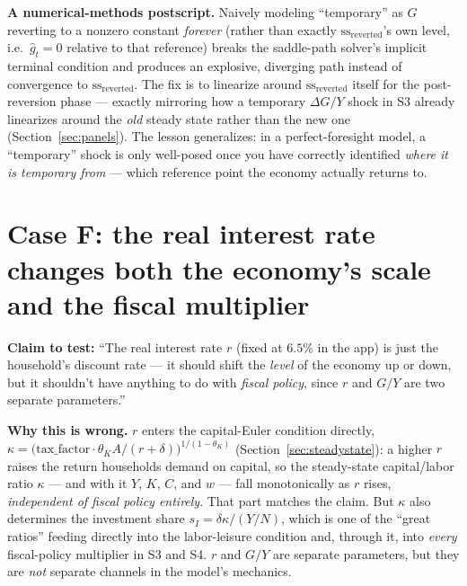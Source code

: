 \documentclass[11pt]{article}
\begin{document}
\begin{notebox}
\textbf{A numerical-methods postscript.} Naively modeling ``temporary''
as $G$ reverting to a nonzero constant \emph{forever} (rather than
exactly $\text{ss}_{\text{reverted}}$'s own level, i.e.\ $\hat g_t=0$
relative to that reference) breaks the saddle-path solver's implicit
terminal condition and produces an explosive, diverging path instead of
convergence to $\text{ss}_{\text{reverted}}$. The fix is to linearize
around $\text{ss}_{\text{reverted}}$ itself for the post-reversion phase
--- exactly mirroring how a temporary $\Delta G/Y$ shock in S3
already linearizes around the \emph{old} steady state rather than the
new one (Section~\ref{sec:panels}). The lesson generalizes: in a
perfect-foresight model, a ``temporary'' shock is only well-posed once
you have correctly identified \emph{where it is temporary from} ---
which reference point the economy actually returns to.
\end{notebox}

\section{Case F: the real interest rate changes both the economy's scale and the fiscal multiplier}
\label{sec:caseF}

\textbf{Claim to test:} ``The real interest rate $r$ (fixed at $6.5\%$ in the app) is
just the household's discount rate --- it should shift the \emph{level}
of the economy up or down, but it shouldn't have anything to do with
\emph{fiscal policy}, since $r$ and $G/Y$ are two separate
parameters.''

\textbf{Why this is wrong.} $r$ enters the capital-Euler condition
directly, $\kappa=\big(\text{tax\_factor}\cdot\theta_K A/(r+\delta)\big)^{1/(1-\theta_K)}$
(Section~\ref{sec:steadystate}): a higher $r$ raises the return households
demand on capital, so the steady-state capital/labor ratio $\kappa$ ---
and with it $Y$, $K$, $C$, and $w$ --- fall monotonically as $r$ rises,
\emph{independent of fiscal policy entirely}. That part matches the
claim. But $\kappa$ also determines the investment share
$s_I=\delta\kappa/(Y/N)$, which is one of the ``great ratios'' feeding
directly into the labor-leisure condition and, through it, into
\emph{every} fiscal-policy multiplier in S3 and S4. $r$ and $G/Y$ are
separate parameters, but they are \emph{not} separate channels in the
model's mechanics.
\end{document}
